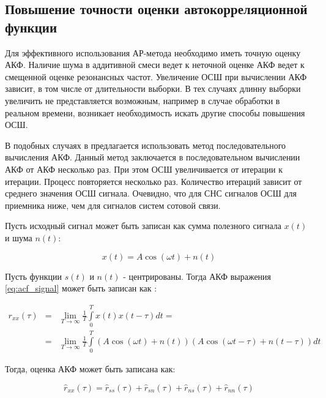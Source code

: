 \subsection{Повышение точности оценки автокорреляционной функции}

Для эффективного использования АР-метода необходимо иметь точную оценку АКФ. Наличие шума в аддитивной смеси ведет к неточной
оценке АКФ ведет к смещенной оценке резонансных частот. Увеличение ОСШ при вычислении АКФ зависит, в том числе от длительности
выборки. В тех случаях длинну выборки увеличить не представляется возможным, например в случае обработки в реальном времени,
возникает необходимость искать другие способы повышения ОСШ.

В подобных случаях в \cite{ostanin_akf} предлагается использовать метод последовательного вычисления АКФ. Данный метод
заключается в последовательном вычислении АКФ от АКФ несколько раз. При этом ОСШ увеличивается от итерации к итерации.
Процесс повторяется несколько раз. Количество итераций зависит от среднего значения ОСШ сигнала. Очевидно, что
для СНС сигналов ОСШ для приемника ниже, чем для сигналов систем сотовой связи.

Пусть исходный сигнал может быть записан как сумма полезного сигнала ${x(t)}$ и шума ${n(t)}$:
\begin{center}
\begin{equation}
	\label{eq:acf_signal}
	x(t) = A \cos{(\omega t)} + n(t)
\end{equation}
\end{center}

Пусть функции ${s(t)}$ и ${n(t)}$ - центрированы. Тогда АКФ выражения \ref{eq:acf_signal} может быть записан как \cite{book_max}:
\begin{center}
\begin{eqnarray}
	\label{eq:acf_rss_signal}
	r_{xx}(\tau)	& = & \lim_{T \to \infty} \frac{1}{T} \int \limits_0^T x(t)x(t-\tau)dt = \nonumber \\
			& = & \lim_{T \to \infty} \frac{1}{T} \int \limits_0^T (A \cos{(\omega t)} + n(t))(A \cos{(\omega t - \tau)} + n(t - \tau))dt
\end{eqnarray}
\end{center}

Тогда, оценка АКФ может быть записана как:
\begin{center}
\begin{equation}
	\label{eq:acf_rss_signal_full}
	\hat{r}_{xx}(\tau)=\hat{r}_{ss}(\tau)+\hat{r}_{sn}(\tau)+\hat{r}_{ns}(\tau) + \hat{r}_{nn}(\tau)
\end{equation}
\end{center}

